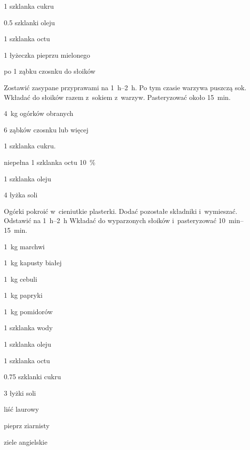 \documentclass[../main.tex]{subfiles}
\begin{document}
\begin{Ingred}[zalewa]
    \item \num{1} szklanka cukru
    \item \num{0.5} szklanki oleju
    \item \num{1} szklanka octu
    \item \num{1} łyżeczka pieprzu mielonego
    \item po \num{1} ząbku czosnku do słoików
\end{Ingred}

Zostawić zasypane przyprawami na \qtyrange{1}{2}{\hour}. Po tym czasie warzywa
puszczą sok. Wkładać do słoików razem z~sokiem z~warzyw. Pasteryzować około
\qty{15}{\minute}.


\begin{Ingred}
    \item \qty{4}{\kilo\gram} ogórków obranych
    \item \num{6} ząbków czosnku lub więcej
    \item \num{1} szklanka cukru.
    \item niepełna \num{1} szklanka octu \qty{10}{\percent}
    \item \num{1} szklanka oleju
    \item \num{4} łyżka soli
\end{Ingred}

Ogórki pokroić w~cieniutkie plasterki. Dodać pozostałe składniki i~wymieszać.
Odstawić na \qtyrange{1}{2}{\hour} Wkładać do wyparzonych słoików
i~pasteryzować \qtyrange{10}{15}{\minute}.


\begin{Ingred}
    \item \qty{1}{\kilo\gram} marchwi
    \item \qty{1}{\kilo\gram} kapusty białej
    \item \qty{1}{\kilo\gram} cebuli
    \item \qty{1}{\kilo\gram} papryki
    \item \qty{1}{\kilo\gram} pomidorów
\end{Ingred}

\begin{Ingred}[zalewa]
    \item \num{1} szklanka wody
    \item \num{1} szklanka oleju
    \item \num{1} szklanka octu
    \item \num{0.75} szklanki cukru
    \item \num{3} łyżki soli
    \item liść laurowy
    \item pieprz ziarnisty
    \item ziele angielskie
\end{Ingred}
\end{document}
